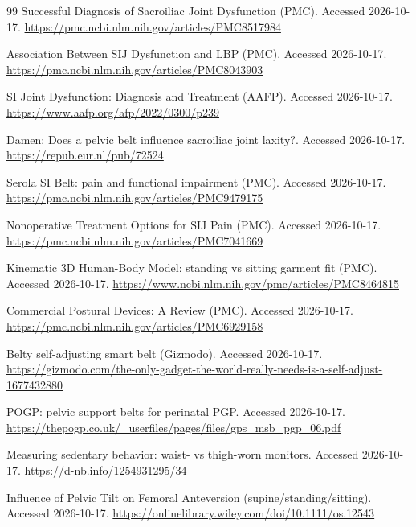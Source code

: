 \begin{thebibliography}{99}
 Successful Diagnosis of Sacroiliac Joint Dysfunction (PMC). Accessed 2026-10-17. \url{https://pmc.ncbi.nlm.nih.gov/articles/PMC8517984}

 Association Between SIJ Dysfunction and LBP (PMC). Accessed 2026-10-17. \url{https://pmc.ncbi.nlm.nih.gov/articles/PMC8043903}

 SI Joint Dysfunction: Diagnosis and Treatment (AAFP). Accessed 2026-10-17. \url{https://www.aafp.org/afp/2022/0300/p239}

 Damen: Does a pelvic belt influence sacroiliac joint laxity?. Accessed 2026-10-17. \url{https://repub.eur.nl/pub/72524}

 Serola SI Belt: pain and functional impairment (PMC). Accessed 2026-10-17. \url{https://pmc.ncbi.nlm.nih.gov/articles/PMC9479175}

 Nonoperative Treatment Options for SIJ Pain (PMC). Accessed 2026-10-17. \url{https://pmc.ncbi.nlm.nih.gov/articles/PMC7041669}

 Kinematic 3D Human-Body Model: standing vs sitting garment fit (PMC). Accessed 2026-10-17. \url{https://www.ncbi.nlm.nih.gov/pmc/articles/PMC8464815}

 Commercial Postural Devices: A Review (PMC). Accessed 2026-10-17. \url{https://pmc.ncbi.nlm.nih.gov/articles/PMC6929158}

 Belty self-adjusting smart belt (Gizmodo). Accessed 2026-10-17. \url{https://gizmodo.com/the-only-gadget-the-world-really-needs-is-a-self-adjust-1677432880}

 POGP: pelvic support belts for perinatal PGP. Accessed 2026-10-17. \url{https://thepogp.co.uk/_userfiles/pages/files/gps_msb_pgp_06.pdf}

 Measuring sedentary behavior: waist- vs thigh-worn monitors. Accessed 2026-10-17. \url{https://d-nb.info/1254931295/34}

 Influence of Pelvic Tilt on Femoral Anteversion (supine/standing/sitting). Accessed 2026-10-17. \url{https://onlinelibrary.wiley.com/doi/10.1111/os.12543}

\end{thebibliography}